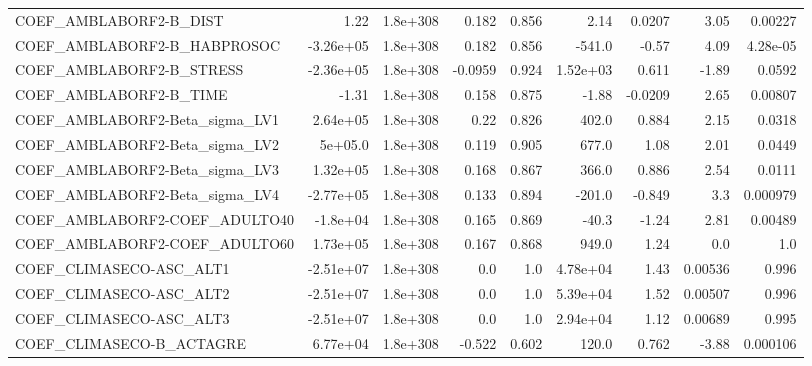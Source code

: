 \begin{tabular}{lrrrrrrrr}
COEF\_AMBLABORF2-B\_DIST            &        1.22 &     1.8e+308 &   0.182 &    0.856 &       2.14 &      0.0207 &         3.05 &       0.00227 \\
COEF\_AMBLABORF2-B\_HABPROSOC       &   -3.26e+05 &     1.8e+308 &   0.182 &    0.856 &     -541.0 &       -0.57 &         4.09 &      4.28e-05 \\
COEF\_AMBLABORF2-B\_STRESS          &   -2.36e+05 &     1.8e+308 & -0.0959 &    0.924 &   1.52e+03 &       0.611 &        -1.89 &        0.0592 \\
COEF\_AMBLABORF2-B\_TIME            &       -1.31 &     1.8e+308 &   0.158 &    0.875 &      -1.88 &     -0.0209 &         2.65 &       0.00807 \\
COEF\_AMBLABORF2-Beta\_sigma\_LV1    &    2.64e+05 &     1.8e+308 &    0.22 &    0.826 &      402.0 &       0.884 &         2.15 &        0.0318 \\
COEF\_AMBLABORF2-Beta\_sigma\_LV2    &     5e+05.0 &     1.8e+308 &   0.119 &    0.905 &      677.0 &        1.08 &         2.01 &        0.0449 \\
COEF\_AMBLABORF2-Beta\_sigma\_LV3    &    1.32e+05 &     1.8e+308 &   0.168 &    0.867 &      366.0 &       0.886 &         2.54 &        0.0111 \\
COEF\_AMBLABORF2-Beta\_sigma\_LV4    &   -2.77e+05 &     1.8e+308 &   0.133 &    0.894 &     -201.0 &      -0.849 &          3.3 &      0.000979 \\
COEF\_AMBLABORF2-COEF\_ADULTO40     &    -1.8e+04 &     1.8e+308 &   0.165 &    0.869 &      -40.3 &       -1.24 &         2.81 &       0.00489 \\
COEF\_AMBLABORF2-COEF\_ADULTO60     &    1.73e+05 &     1.8e+308 &   0.167 &    0.868 &      949.0 &        1.24 &          0.0 &           1.0 \\
COEF\_CLIMASECO-ASC\_ALT1           &   -2.51e+07 &     1.8e+308 &     0.0 &      1.0 &   4.78e+04 &        1.43 &      0.00536 &         0.996 \\
COEF\_CLIMASECO-ASC\_ALT2           &   -2.51e+07 &     1.8e+308 &     0.0 &      1.0 &   5.39e+04 &        1.52 &      0.00507 &         0.996 \\
COEF\_CLIMASECO-ASC\_ALT3           &   -2.51e+07 &     1.8e+308 &     0.0 &      1.0 &   2.94e+04 &        1.12 &      0.00689 &         0.995 \\
COEF\_CLIMASECO-B\_ACTAGRE          &    6.77e+04 &     1.8e+308 &  -0.522 &    0.602 &      120.0 &       0.762 &        -3.88 &      0.000106 \\

\end{tabular}
